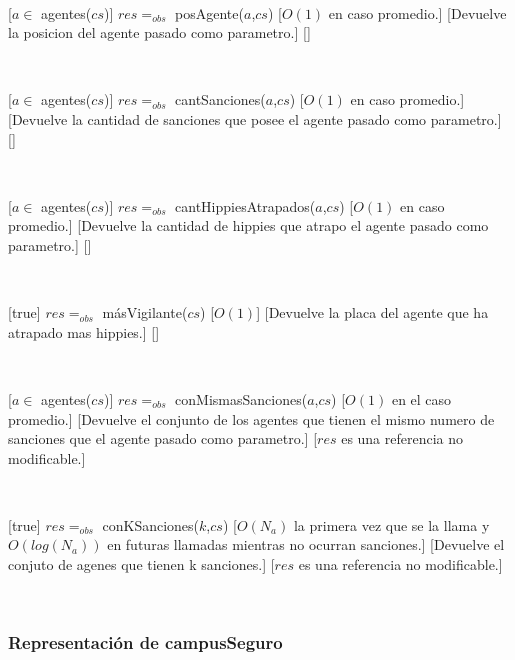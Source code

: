~

[$a \in$ agentes($cs$)]
{$res =_{obs}$ posAgente($a$,$cs$)}
[$O(1)$ en caso promedio.]
[Devuelve la posicion del agente pasado como parametro.]
[]

~

[$a \in$ agentes($cs$)]
{$res =_{obs}$ cantSanciones($a$,$cs$)}
[$O(1)$ en caso promedio.]
[Devuelve la cantidad de sanciones que posee el agente pasado como parametro.]
[]

~

[$a \in$ agentes($cs$)]
{$res =_{obs}$ cantHippiesAtrapados($a$,$cs$)}
[$O(1)$ en caso promedio.]
[Devuelve la cantidad de hippies que atrapo el agente pasado como parametro.]
[]

~

[true]
{$res =_{obs}$ másVigilante($cs$)}
[$O(1)$]
[Devuelve la placa del agente que ha atrapado mas hippies.]
[]

~

[$a \in$ agentes($cs$)]
{$res =_{obs}$ conMismasSanciones($a$,$cs$)}
[$O(1)$ en el caso promedio.]
[Devuelve el conjunto de los agentes que tienen el mismo numero de sanciones que el agente pasado como parametro.]
[$res$ es una referencia no modificable.]

~

[true]
{$res =_{obs}$ conKSanciones($k$,$cs$)}
[$O(N_a)$ la primera vez que se la llama y $O(log(N_a))$ en futuras llamadas mientras no ocurran sanciones.]
[Devuelve el conjuto de agenes que tienen k sanciones.]
[$res$ es una referencia no modificable.]

~
\pagebreak

\subsubsection{Representación de campusSeguro}

